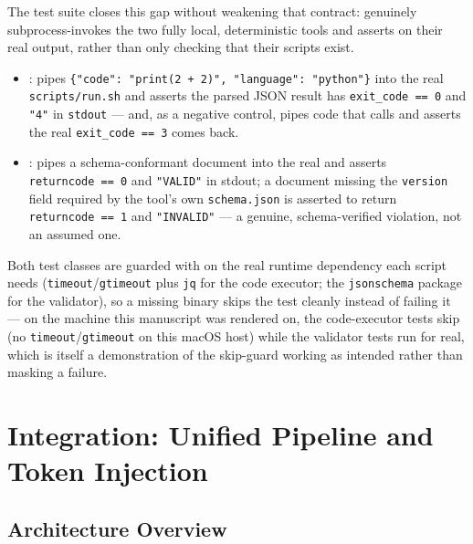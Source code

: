 \documentclass[
]{article}
\providecommand{\tightlist}{%
  \setlength{\itemsep}{0pt}\setlength{\parskip}{0pt}}
\begin{document}
The test suite closes this gap without weakening that contract:
 genuinely
subprocess-invokes the two fully local, deterministic tools and asserts
on their real output, rather than only checking that their scripts
exist.

\begin{itemize}
\tightlist
\item
  \textbf{}:
   pipes
  \texttt{\{"code":\ "print(2\ +\ 2)",\ "language":\ "python"\}} into
  the real \texttt{scripts/run.sh} and asserts the parsed JSON result
  has \texttt{exit\_code\ ==\ 0} and \texttt{"4"} in \texttt{stdout} ---
  and, as a negative control, pipes code that calls
   and asserts the real
  \texttt{exit\_code\ ==\ 3} comes back.
\item
  \textbf{}: 
  pipes a schema-conformant document into the real
   and asserts \texttt{returncode\ ==\ 0}
  and \texttt{"VALID"} in stdout; a document missing the
  \texttt{version} field required by the tool's own \texttt{schema.json}
  is asserted to return \texttt{returncode\ ==\ 1} and
  \texttt{"INVALID"} --- a genuine, schema-verified violation, not an
  assumed one.
\end{itemize}

Both test classes are guarded with  on the
real runtime dependency each script needs
(\texttt{timeout}/\texttt{gtimeout} plus \texttt{jq} for the code
executor; the \texttt{jsonschema} package for the validator), so a
missing binary skips the test cleanly instead of failing it --- on the
machine this manuscript was rendered on, the code-executor tests skip
(no \texttt{timeout}/\texttt{gtimeout} on this macOS host) while the
validator tests run for real, which is itself a demonstration of the
skip-guard working as intended rather than masking a failure.

\newpage

\section{Integration: Unified Pipeline and Token
Injection}\label{sec:integration}

\subsection{Architecture Overview}\label{architecture-overview}
\end{document}
